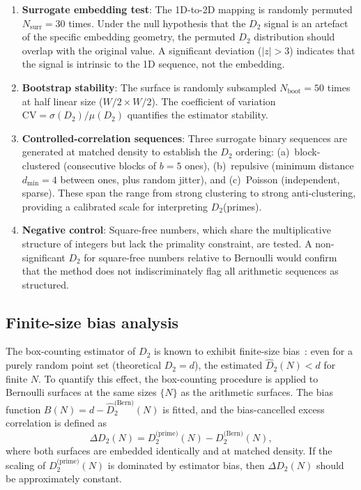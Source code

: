 \documentclass[final,3p,times,twocolumn]{elsarticle}
\theoremstyle{definition}
\begin{document}
\begin{enumerate}
  \item \textbf{Surrogate embedding test}: The 1D-to-2D mapping is
        randomly permuted $N_{\text{surr}} = 30$ times. Under the null
        hypothesis that the $D_2$ signal is an artefact of the specific
        embedding geometry, the permuted $D_2$ distribution should
        overlap with the original value. A significant deviation
        ($|z| > 3$) indicates that the signal is intrinsic to the 1D
        sequence, not the embedding.
  \item \textbf{Bootstrap stability}: The surface is randomly
        subsampled $N_{\text{boot}} = 50$ times at half linear size
        ($W/2 \times W/2$). The coefficient of variation
        $\text{CV} = \sigma(D_2)/\mu(D_2)$ quantifies the estimator
        stability.
  \item \textbf{Controlled-correlation sequences}: Three surrogate
        binary sequences are generated at matched density to establish
        the $D_2$ ordering: (a)~block-clustered (consecutive blocks of
        $b=5$ ones), (b)~repulsive (minimum distance $d_{\min}=4$
        between ones, plus random jitter), and (c)~Poisson
        (independent, sparse). These span the range from strong
        clustering to strong anti-clustering, providing a calibrated
        scale for interpreting $D_2$(primes).
  \item \textbf{Negative control}: Square-free numbers, which share
        the multiplicative structure of integers but lack the primality
        constraint, are tested. A non-significant $D_2$ for square-free
        numbers relative to Bernoulli would confirm that the method does
        not indiscriminately flag all arithmetic sequences as structured.
\end{enumerate}

\subsection{Finite-size bias analysis}
\label{sec:bias}

The box-counting estimator of $D_2$ is known to exhibit finite-size
bias~\cite{GRASSBERGER-PROCACCIA-1983, THEILER-1986}: even for a purely
random point set (theoretical $D_2 = d$), the estimated
$\hat{D}_2(N) < d$ for finite $N$. To quantify this effect, the
box-counting procedure is applied to Bernoulli surfaces at the same
sizes $\{N\}$ as the arithmetic surfaces. The bias function
$B(N) = d - \hat{D}_2^{\text{(Bern)}}(N)$ is fitted, and the
bias-cancelled excess correlation is defined as
\begin{equation}
  \Delta D_2(N) = D_2^{\text{(prime)}}(N) - D_2^{\text{(Bern)}}(N),
  \label{eq:delta}
\end{equation}
where both surfaces are embedded identically and at matched density.
If the scaling of $D_2^{\text{(prime)}}(N)$ is dominated by estimator
bias, then $\Delta D_2(N)$ should be approximately constant.
\end{document}
